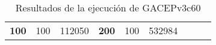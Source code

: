 \begin{table}[H]
\begin{tabular}{|ccrccrccc}
\multicolumn{1}{|c|}{\multirow{-39}{*}{\cellcolor[HTML]{FFFFC7}\textbf{100}}} & \multicolumn{1}{c|}{\multirow{-9}{*}{\cellcolor[HTML]{DDFDFF}100}} & \multicolumn{1}{r|}{\cellcolor[HTML]{DAE8FC}112050}    & \multicolumn{1}{c|}{\multirow{-39}{*}{\cellcolor[HTML]{FFFFC7}\textbf{200}}} & \multicolumn{1}{c|}{\multirow{-10}{*}{\cellcolor[HTML]{DDFDFF}100}} & \multicolumn{1}{r|}{\cellcolor[HTML]{DDFDFF}532984}    &                                                                              &                                                                    &                                                        \\ \cline{1-6}
\end{tabular}
\caption{\label{GACEPv3c60GRASP}Resultados de la ejecución de GACEPv3c60}
\end{table}

